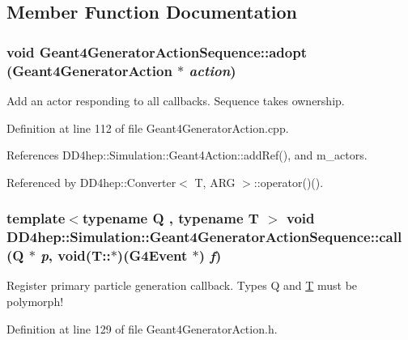 \subsection{Member Function Documentation}
\hypertarget{class_d_d4hep_1_1_simulation_1_1_geant4_generator_action_sequence_ac6d847bdeeaa2b6bd46f1ae89fc15277}{
\subsubsection[{adopt}]{\setlength{\rightskip}{0pt plus 5cm}void Geant4GeneratorActionSequence::adopt ({\bf Geant4GeneratorAction} $\ast$ {\em action})}}
\label{class_d_d4hep_1_1_simulation_1_1_geant4_generator_action_sequence_ac6d847bdeeaa2b6bd46f1ae89fc15277}


Add an actor responding to all callbacks. Sequence takes ownership. 

Definition at line 112 of file Geant4GeneratorAction.cpp.

References DD4hep::Simulation::Geant4Action::addRef(), and m\_\-actors.

Referenced by DD4hep::Converter$<$ T, ARG $>$::operator()().\hypertarget{class_d_d4hep_1_1_simulation_1_1_geant4_generator_action_sequence_a05f04216668a2736d720cf9a8a3e012c}{
\subsubsection[{call}]{\setlength{\rightskip}{0pt plus 5cm}template$<$typename Q , typename T $>$ void DD4hep::Simulation::Geant4GeneratorActionSequence::call (Q $\ast$ {\em p}, \/  void(T::$\ast$)(G4Event $\ast$) {\em f})}}
\label{class_d_d4hep_1_1_simulation_1_1_geant4_generator_action_sequence_a05f04216668a2736d720cf9a8a3e012c}


Register primary particle generation callback. Types Q and \hyperlink{class_t}{T} must be polymorph! 

Definition at line 129 of file Geant4GeneratorAction.h.

